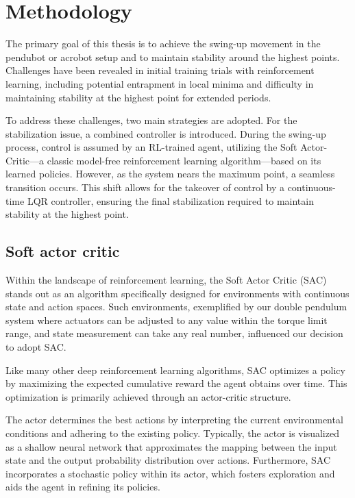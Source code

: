 \chapter{Methodology}
The primary goal of this thesis is to achieve the swing-up movement in the pendubot or acrobot setup and to maintain stability around the highest points. Challenges have been revealed in initial training trials with reinforcement learning, including potential entrapment in local minima and difficulty in maintaining stability at the highest point for extended periods.

To address these challenges, two main strategies are adopted. For the stabilization issue, a combined controller is introduced. During the swing-up process, control is assumed by an RL-trained agent, utilizing the Soft Actor-Critic—a classic model-free reinforcement learning algorithm—based on its learned policies. However, as the system nears the maximum point, a seamless transition occurs. This shift allows for the takeover of control by a continuous-time LQR controller, ensuring the final stabilization required to maintain stability at the highest point.

\section{Soft actor critic}
Within the landscape of reinforcement learning, the Soft Actor Critic (SAC)\cite{haarnoja2018soft} stands out as an algorithm specifically designed for environments with continuous state and action spaces. Such environments, exemplified by our double pendulum system where actuators can be adjusted to any value within the torque limit range, and state measurement can take any real number, influenced our decision to adopt SAC.

Like many other deep reinforcement learning algorithms, SAC optimizes a policy by maximizing the expected cumulative reward the agent obtains over time. This optimization is primarily achieved through an actor-critic structure\cite{konda1999actor}.

The actor determines the best actions by interpreting the current environmental conditions and adhering to the existing policy. Typically, the actor is visualized as a shallow neural network that approximates the mapping between the input state and the output probability distribution over actions. Furthermore, SAC incorporates a stochastic policy within its actor, which fosters exploration and aids the agent in refining its policies.

